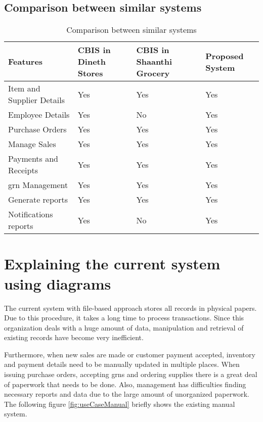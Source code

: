 \documentclass[12pt]{report}
\begin{document}
\subsection{Comparison between similar systems}
\begin{table}[H]
	\centering
	\begin{tabular}{ |p{4.5cm}|p{3cm}|p{3cm}|p{2cm}| }
		\hline
		\bf{Features}             & \bf{CBIS in Dineth Stores} & \bf{CBIS in Shaanthi Grocery} & \bf{Proposed System} \\
		\hline
		Item and Supplier Details & Yes                        & Yes                           & Yes                  \\
		\hline
		Employee Details          & Yes                        & No                            & Yes                  \\
		\hline
		Purchase Orders           & Yes                        & Yes                           & Yes                  \\
		\hline
		Manage Sales              & Yes                        & Yes                           & Yes                  \\
		\hline
		Payments and Receipts     & Yes                        & Yes                           & Yes                  \\
		\hline
		\acrshort{grn} Management & Yes                        & Yes                           & Yes                  \\
		\hline
		Generate reports          & Yes                        & Yes                           & Yes                  \\
		\hline
		Notifications reports     & Yes                        & No                            & Yes                  \\
		\hline
	\end{tabular}
	\caption{Comparison between similar systems}
\end{table}

\section{Explaining the current system using diagrams}
The current system with file-based approach stores all records in physical papers. Due to this procedure, it takes a long time to process transactions. Since this organization deals with a huge amount of data, manipulation and retrieval of existing records have become very inefficient.

Furthermore, when new sales are made or customer payment accepted, inventory and payment details need to be manually updated in multiple places. When issuing purchase orders, accepting \acrshort{grn}s and ordering supplies there is a great deal of paperwork that needs to be done. Also, management has difficulties finding necessary reports and data due to the large amount of unorganized paperwork. The following figure \ref{fig:useCaseManual} briefly shows the existing manual system.
\end{document}
